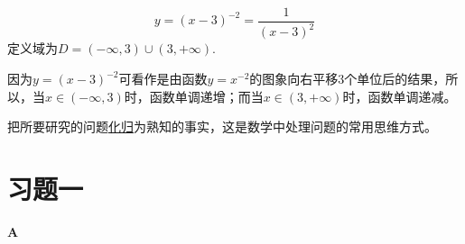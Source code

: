  \begin{solution}
 \[y=(x-3)^{-2}=\frac{1}{(x-3)^2}\]
 定义域为$D=(-\infty,3)\cup (3,+\infty)$.
 
 因为$y=(x-3)^{-2}$可看作是由函数$y=x^{-2}$的图象向右平移3个单位后的结果，所以，当$x\in (-\infty,3)$时，函数单调递增；而当$x\in(3,+\infty)$时，函数单调递减。
 \end{solution}
 
 \begin{note}
     把所要研究的问题\underline{化归}为熟知的事实，这是数学中处理问题的常用思维方式。
 \end{note}
 
 
 \section*{习题一}
 \begin{center}
     \bfseries A
 \end{center}
 
